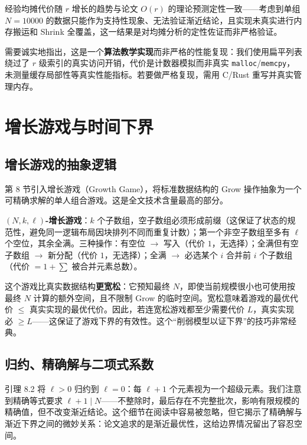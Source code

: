 \documentclass[12pt,a4paper]{ctexart}
\begin{document}
经验均摊代价随 $r$ 增长的趋势与论文 $O(r)$ 的理论预测定性一致——考虑到单组 $N=10000$ 的数据只能作为支持性现象、无法验证渐近结论，且实现未真实进行内存搬运和 Shrink 全覆盖，这一结果是对均摊分析的定性佐证而非严格验证。

需要诚实地指出，这是一个\textbf{算法教学实现}而非严格的性能复现：我们使用扁平列表绕过了 $r$ 级索引的真实访问开销，代价是计数器模拟而非真实 \texttt{malloc}/\texttt{memcpy}，未测量缓存局部性等真实性能指标。若要做严格复现，需用 C/Rust 重写并真实管理内存。

\section{增长游戏与时间下界}

\subsection{增长游戏的抽象逻辑}

第 8 节引入增长游戏（Growth Game），将标准数据结构的 Grow 操作抽象为一个可精确求解的单人组合游戏。这是全文技术含量最高的部分。

\textbf{$(N, k, \ell)$-增长游戏}：$k$ 个子数组，空子数组必须形成前缀（这保证了状态的规范性，避免同一逻辑布局因块排列不同而重复计数）；第一个非空子数组至多有 $\ell$ 个空位，其余全满。三种操作：有空位 $\to$ 写入（代价 $1$，无选择）；全满但有空子数组 $\to$ 新分配（代价 $1$，无选择）；全满 $\to$ 必选某个 $i$ 合并前 $i$ 个子数组（代价 $= 1 + \sum$ 被合并元素总数）。

这个游戏比真实数据结构\textbf{更宽松}：它预知最终 $N$，即使当前规模很小也可使用按最终 $N$ 计算的额外空间，且不限制 Grow 的临时空间。宽松意味着游戏的最优代价 $\le$ 真实实现的最优代价。因此，若连宽松游戏都至少需要代价 $L$，真实实现必 $\ge L$——这保证了游戏下界的有效性。这个``削弱模型以证下界''的技巧非常经典。

\subsection{归约、精确解与二项式系数}

引理 8.2 将 $\ell > 0$ 归约到 $\ell = 0$：每 $\ell+1$ 个元素视为一个超级元素。我们注意到精确等式要求 $\ell+1 \mid N$——不整除时，最后存在不完整批次，影响有限规模的精确值，但不改变渐近结论。这个细节在阅读中容易被忽略，但它揭示了精确解与渐近下界之间的微妙关系：论文追求的是渐近最优性，这给边界情况留出了容忍空间。
\end{document}
